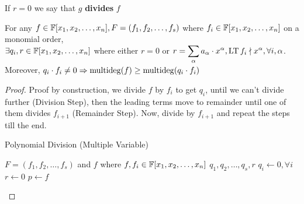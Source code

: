 \documentclass[a4paper,11pt]{article}
\begin{document}
\begin{note}
    If $r=0$ we say that $g$ \textbf{divides} $f$
\end{note}
\begin{theorem}
    For any $f\in\mathbb{F}[x_1, x_2, \ldots, x_n],\\ F=(f_1,f_2,\ldots,f_s)$  where $f_i \in\mathbb{F}[x_1, x_2, \ldots, x_n]$ on a monomial order, \\$\exists q_i, r\in\mathbb{F}[x_1, x_2, \ldots, x_n]$ where either $r=0$ or $r=\displaystyle\sum_{\alpha}a_\alpha\cdot x^\alpha, \operatorname{LT}{f_i} \nmid x^\alpha, \forall i, \alpha$.\\
    Moreover, $q_i \cdot f_i\neq 0 \Rightarrow \operatorname{multideg}(f)\geq\operatorname{multideg}(q_i\cdot f_i)$
\end{theorem}
\begin{proof}
    Proof by construction, we divide $f$ by $f_i$ to get $q_i$, until we can't divide further (Division Step), then the leading terms move to remainder until one of them divides $f_{i+1}$ (Remainder Step). Now, divide by $f_{i+1}$ and repeat the steps till the end.
    \begin{center}
        \begin{algorithm}
        \caption{Polynomial Division (Multiple Variable)}\label{alg:polynomialdivisionmultiple}
        \begin{algorithmic} 
        \Require $F =(f_1,f_2,\ldots,f_s)$ and $f$ where $f,f_i\in\mathbb{F}[x_1, x_2, \ldots, x_n]$
        \Ensure $q_1,q_2,\ldots,q_s,r$
        \State $q_i \gets 0, \forall i$
        \State $r \gets 0$
        \State $p \gets f$
            

\end{algorithmic}
\end{algorithm}
\end{center}
\end{proof}
\end{document}
